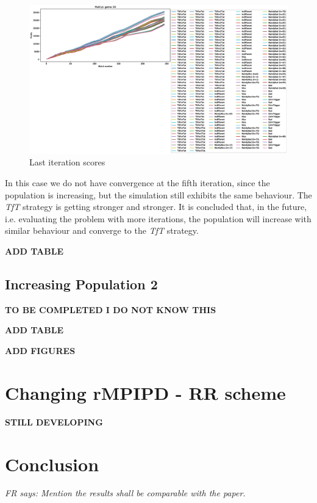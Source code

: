 \documentclass[journal,a4paper,10pt,twoside]{IEEEtran} %
\newcommand{\FR}[1]{\textit{\color{ForestGreen}FR says: #1}}
\begin{document}
\begin{figure}[!ht]
    \centering
    \includegraphics[width=1\columnwidth]{../img/ripdmp-incr/ripdmp-scores-increasing-pop-50-r4}
    \caption{Last iteration scores}
    \label{fig:incrLI}
\end{figure}

In this case we do not have convergence at the fifth iteration, since the population is increasing, but the simulation still exhibits the same behaviour. The \textit{TfT} strategy is getting stronger and stronger. It is concluded that, in the future, i.e. evaluating the problem with more iterations, the population will increase with similar behaviour and converge to the \textit{TfT} strategy.

\textbf{ADD TABLE}

\subsection{Increasing Population 2}
\textbf{TO BE COMPLETED I DO NOT KNOW THIS}

\textbf{ADD TABLE}

\textbf{ADD FIGURES}

\section{Changing rMPIPD - RR scheme} \label{s:crIPDMP}
\textbf{STILL DEVELOPING}

\section{Conclusion} \label{s:conc}

\FR{Mention the results shall be comparable with the paper.}

\balance
%
%
\end{document}
